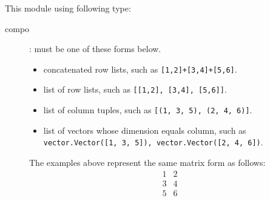  This module using following type:
 \begin{description}
   \item[compo]:
      must be one of these forms below.\\
     \begin{itemize}
       \item concatenated row lists, such as {\tt [1,2]+[3,4]+[5,6]}.
       \item list of row lists, such as {\tt [[1,2], [3,4], [5,6]]}.
       \item list of column tuples, such as {\tt [(1, 3, 5), (2, 4, 6)]}.
       \item list of vectors whose dimension equals column, such as {\tt vector.Vector([1, 3, 5]), vector.Vector([2, 4, 6])}.
     \end{itemize}
     The examples above represent the same matrix form as follows:
     \begin{equation*}
     \begin{array}{cc}
       1 & 2\\
       3 & 4\\
       5 & 6\\
     \end{array}
     \end{equation*}
 \end{description}

\C


